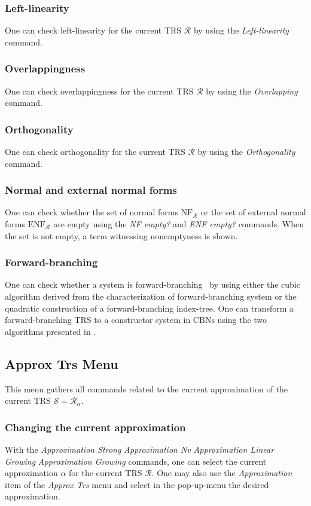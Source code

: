 \documentclass[11pt]{llncs}
\newcommand{\RR}{\mathcal{R}}
\newcommand{\Sc}{\mathcal{S}}
\newcommand{\NF}{\text{NF}}
\newcommand{\ENF}{\text{ENF}}
\newcommand{\CBNs}{\text{CBNs}}
\def\autocom#1{\textsl{#1 }}
\begin{document}
\subsubsection{Left-linearity}
One can check left-linearity for the current TRS $\RR$ 
by using the \autocom{Left-linearity} command.
\subsubsection{Overlappingness}
One can check overlappingness for the current TRS $\RR$
by using the \autocom{Overlapping} command.
\subsubsection{Orthogonality}
One can check orthogonality for the current TRS $\RR$ 
by using the \autocom{Orthogonality} command.
\subsubsection{Normal and external normal forms}
One can check whether the set of normal forms $\NF_\RR$ or the set of
external normal forms $\ENF_\RR$ are empty using the \autocom{NF empty?}
and \autocom{ENF empty?} commands.
When the set is not empty, a term witnessing nonemptyness is shown.
\subsubsection{Forward-branching}
One can check whether a system is forward-branching~\cite{D94}
by using either the cubic algorithm derived from the characterization of
forward-branching system or the quadratic construction of a
forward-branching index-tree.
One can transform a forward-branching TRS to a constructor system in
$\CBNs$ using the two algorithms presented in \cite{bs-ris:jsc-simulation}.

\subsection{Approx Trs Menu}
This menu gathers all commands related to the current approximation
of the current TRS $\Sc = \RR_\alpha$. 

\subsubsection{Changing the current approximation}
With the \autocom{Approximation Strong} 
\autocom{Approximation Nv} 
\autocom{Approximation Linear Growing} 
\autocom{Approximation Growing} 
commands,
one can select the current approximation $\alpha$ for the current TRS $\RR$.
One may also use the \autocom{Approximation} item of the
\autocom{Approx Trs} menu and select in the pop-up-menu the desired
approximation.
\end{document}
